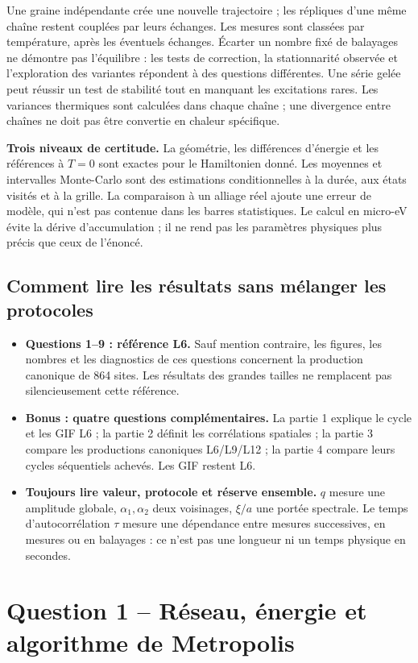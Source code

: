 \documentclass[10pt,a4paper]{article}
\begin{document}
Une graine indépendante crée une nouvelle trajectoire ; les répliques
d'une même chaîne restent couplées par leurs échanges. Les mesures sont
classées par température, après les éventuels échanges. Écarter un nombre
fixé de balayages ne démontre pas l'équilibre : les tests de correction,
la stationnarité observée et l'exploration des variantes répondent à des
questions différentes. Une série gelée peut réussir un test de stabilité
tout en manquant les excitations rares. Les variances thermiques sont
calculées dans chaque chaîne ; une divergence entre chaînes ne doit pas
être convertie en chaleur spécifique.

\textbf{Trois niveaux de certitude.} La géométrie, les différences d'énergie
et les références à $T=0$ sont exactes pour le Hamiltonien donné.
Les moyennes et intervalles Monte-Carlo sont des estimations conditionnelles
à la durée, aux états visités et à la grille. La comparaison à un alliage
réel ajoute une erreur de modèle, qui n'est pas contenue dans les barres
statistiques. Le calcul en micro-eV évite la dérive d'accumulation ; il ne
rend pas les paramètres physiques plus précis que ceux de l'énoncé.

\subsection*{Comment lire les résultats sans mélanger les protocoles}
\begin{itemize}
\item \textbf{Questions 1--9 : référence L6.} Sauf mention contraire,
les figures, les nombres et les diagnostics de ces questions concernent
la production canonique de 864 sites. Les résultats des grandes tailles
ne remplacent pas silencieusement cette référence.
\item \textbf{Bonus : quatre questions complémentaires.} La partie 1
explique le cycle et les GIF L6 ; la partie 2 définit les corrélations
spatiales ; la partie 3 compare les productions canoniques L6/L9/L12 ;
la partie 4 compare leurs cycles séquentiels achevés. Les GIF restent L6.
\item \textbf{Toujours lire valeur, protocole et réserve ensemble.}
$q$ mesure une amplitude globale, $\alpha_1,\alpha_2$ deux voisinages,
$\xi/a$ une portée spectrale. Le temps d'autocorrélation $\tau$ mesure
une dépendance entre mesures successives, en mesures ou en balayages :
ce n'est pas une longueur ni un temps physique en secondes.
\end{itemize}

\section{Question 1 -- Réseau, énergie et algorithme de Metropolis}
\end{document}
